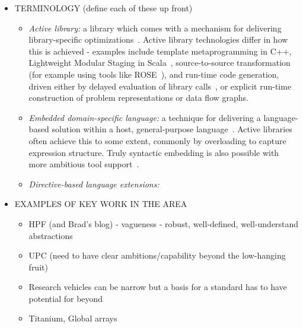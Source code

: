 \begin{itemize}
\item TERMINOLOGY (define each of these up front)
  \begin{itemize}
  \item \emph{Active library:} a library which comes with a mechanism for delivering library-specific optimizations~\cite{DBLP:journals/corr/math-NA-9810022}.  Active library technologies differ in how this is achieved - examples include template metaprogramming in C++, Lightweight Modular Staging in Scala~\cite{DBLP:journals/cacm/RompfO12}, source-to-source transformation (for example using tools like ROSE~\cite{DBLP:conf/lcpc/YiQ04}), and run-time code generation, driven either by delayed evaluation of library calls~\cite{DBLP:journals/scp/RussellMKB11}, or explicit run-time construction of problem representations or data flow graphs.
  \item \emph{Embedded domain-specific language:} a technique for delivering a language-based solution within a host, general-purpose language~\cite{Hudak96buildingdomain-specific}.  Active libraries often achieve this to some extent, commonly by overloading to capture expression structure.  Truly syntactic embedding is also possible with more ambitious tool support~\cite{Erdweg:2011:SLS:2076021.2048099}.
  \item \emph{Directive-based language extensions:}

  \end{itemize}

\item EXAMPLES OF KEY WORK IN THE AREA
  \begin{itemize}
  \item HPF (and Brad’s blog) - vagueness - robust, well-defined, well-understand abstractions 
  \item UPC (need to have clear ambitions/capability beyond the low-hanging fruit)
  \item Research vehicles can be narrow but a basis for a standard has to have potential for beyond
  \item Titanium, Global arrays
  \end{itemize}


\end{itemize}
